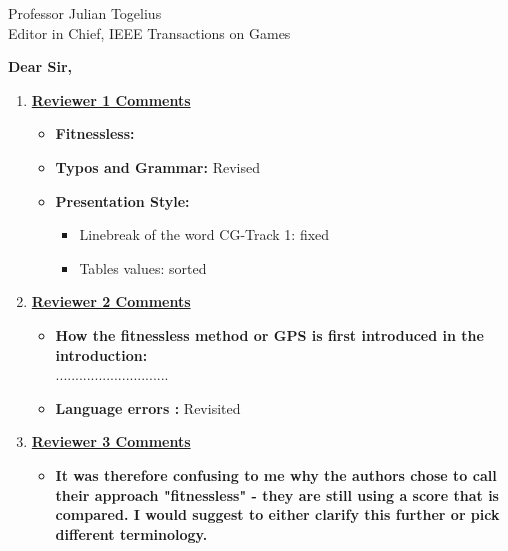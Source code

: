 \documentclass[10pt]{letter} %
\begin{document}

\begin{letter}{Professor Julian Togelius \\ Editor in Chief, IEEE Transactions on Games} %


\opening{\textbf{Dear Sir,}}


\begin{enumerate}
\item {\bf \underline{ Reviewer 1 Comments}}\\
	\begin{itemize}
		\item {\bf Fitnessless:}
		\item {\bf Typos and Grammar:} Revised
		\item  {\bf Presentation Style:}
		\begin{itemize}
			\item Linebreak of the word CG-Track 1:  fixed
			\item Tables values: sorted
		\end{itemize}
	\end{itemize}
\item {\bf \underline{ Reviewer 2 Comments}}\\
	\begin{itemize}
		\item {\bf How the fitnessless method or GPS is first introduced in the introduction:}\\
.............................
		\item {\bf Language errors :} Revisited
	\end{itemize}
\item {\bf \underline{ Reviewer 3 Comments}}\\
	\begin{itemize}
	\item {\bf It was therefore confusing to me why the authors chose to call their approach "fitnessless" - they are still using a score that is compared. I would suggest to either clarify this further or pick different terminology.}\\

\end{itemize}
\end{enumerate}
\end{letter}
\end{document}
